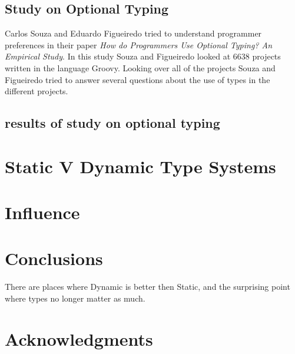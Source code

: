 \documentclass{sig-alternate}
\begin{document}
\subsection{Study on Optional Typing}
Carlos Souza and Eduardo Figueiredo tried to understand programmer preferences in their paper \emph{How do Programmers Use Optional Typing? An Empirical Study}. In this study Souza and Figueiredo looked at 6638 projects written in the language Groovy. Looking over all of the projects Souza and Figueiredo tried to answer several questions about the use of types in the different projects.

\subsection{results of study on optional typing}


\section{Static V Dynamic Type Systems}\label{benifits}
\cite{Stuchlik2011}

\section{Influence}
\cite{Mayer2012}

\section{Conclusions}\label{results}
There are places where Dynamic is better then Static, and the surprising point where types no longer matter as much.

\section{Acknowledgments}




\end{document}
